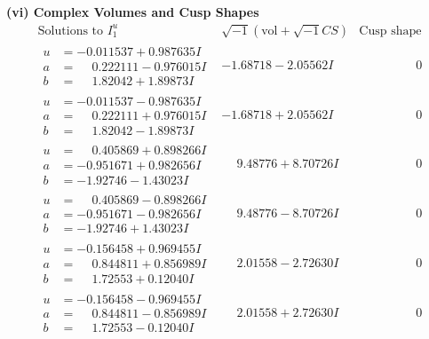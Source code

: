 \documentclass[1p]{elsarticle_modified}
\theoremstyle{definition}
\newcommand{\I}{\sqrt{-1}}
\begin{document}
\newpage\flushleft \textbf{(vi) Complex Volumes and Cusp Shapes}
$$\begin{array}{c|c|c}  
\text{Solutions to }I^u_{1}& \I (\text{vol} + \sqrt{-1}CS) & \text{Cusp shape}\\
 \hline 
\begin{aligned}
u &= -0.011537 + 0.987635 I \\
a &= \phantom{-}0.222111 - 0.976015 I \\
b &= \phantom{-}1.82042 + 1.89873 I\end{aligned}
 & -1.68718 - 2.05562 I & \phantom{-0.000000 } 0 \\ \hline\begin{aligned}
u &= -0.011537 - 0.987635 I \\
a &= \phantom{-}0.222111 + 0.976015 I \\
b &= \phantom{-}1.82042 - 1.89873 I\end{aligned}
 & -1.68718 + 2.05562 I & \phantom{-0.000000 } 0 \\ \hline\begin{aligned}
u &= \phantom{-}0.405869 + 0.898266 I \\
a &= -0.951671 + 0.982656 I \\
b &= -1.92746 - 1.43023 I\end{aligned}
 & \phantom{-}9.48776 + 8.70726 I & \phantom{-0.000000 } 0 \\ \hline\begin{aligned}
u &= \phantom{-}0.405869 - 0.898266 I \\
a &= -0.951671 - 0.982656 I \\
b &= -1.92746 + 1.43023 I\end{aligned}
 & \phantom{-}9.48776 - 8.70726 I & \phantom{-0.000000 } 0 \\ \hline\begin{aligned}
u &= -0.156458 + 0.969455 I \\
a &= \phantom{-}0.844811 + 0.856989 I \\
b &= \phantom{-}1.72553 + 0.12040 I\end{aligned}
 & \phantom{-}2.01558 - 2.72630 I & \phantom{-0.000000 } 0 \\ \hline\begin{aligned}
u &= -0.156458 - 0.969455 I \\
a &= \phantom{-}0.844811 - 0.856989 I \\
b &= \phantom{-}1.72553 - 0.12040 I\end{aligned}
 & \phantom{-}2.01558 + 2.72630 I & \phantom{-0.000000 } 0 \\ \hline\begin{aligned}

\end{aligned}
\end{array}$$
\end{document}
